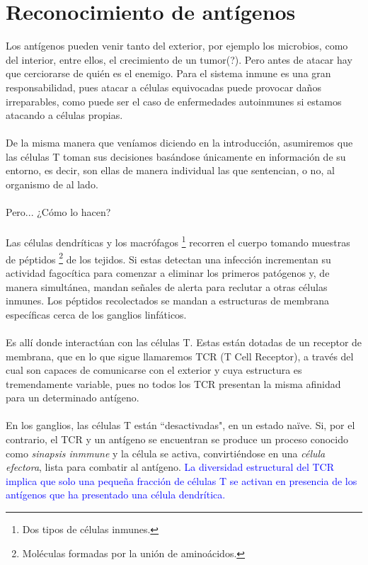 \documentclass{article}
\begin{document}
	 \section{Reconocimiento de antígenos}
	 Los antígenos pueden venir tanto del exterior, por ejemplo los microbios, como del interior, entre ellos, el crecimiento de un tumor(?). Pero antes de atacar hay que cerciorarse de quién es el enemigo. Para el sistema inmune es una gran responsabilidad, pues atacar a células equivocadas puede provocar daños irreparables, como puede ser el caso de enfermedades autoinmunes si estamos atacando a células propias.
	 \\
	 \\
	 De la misma manera que veníamos diciendo en la introducción, asumiremos que las células T toman sus decisiones basándose únicamente en información de su entorno, es decir, son ellas de manera individual las que sentencian, o no, al organismo de al lado.
	 \\
 	 \\
 	 Pero... ¿Cómo lo hacen?
 	 \\
 	 \\
 	 Las células dendríticas y los macrófagos \footnote{Dos tipos de células inmunes.} recorren el cuerpo tomando muestras de péptidos \footnote{Moléculas formadas por la unión de aminoácidos.} de los tejidos. Si estas detectan una infección incrementan su actividad fagocítica para comenzar a eliminar los primeros patógenos y, de manera simultánea, mandan señales de alerta para reclutar a otras células inmunes. Los péptidos recolectados se mandan a estructuras de membrana específicas cerca de los ganglios linfáticos.
 	 \\
 	 \\
 	 Es allí donde interactúan con las células T. Estas están dotadas de un receptor de membrana, que en lo que sigue llamaremos TCR (T Cell Receptor), a través del cual son capaces de comunicarse con el exterior y cuya estructura es tremendamente variable, pues no todos los TCR presentan la misma afinidad para un determinado antígeno.
 	 \\
 	 \\
 	 En los ganglios, las células T están ``desactivadas", en un estado naïve. Si, por el contrario, el TCR y un antígeno se encuentran se produce un proceso conocido como \textit{sinapsis inmmune} y la célula se activa, convirtiéndose en una \textit{célula efectora}, lista para combatir al antígeno.
 	 \textcolor{blue}{La diversidad estructural del TCR implica que solo una pequeña fracción de células T se activan en presencia de los antígenos que ha presentado una célula dendrítica.}
\end{document}
